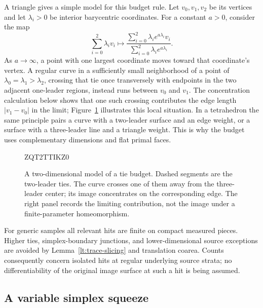 \documentclass[11pt]{article}
\numberwithin{equation}{section}
\theoremstyle{definition}
\theoremstyle{remark}
\begin{document}
A triangle gives a simple model for this budget rule. Let
$v_0,v_1,v_2$ be its vertices and let $\lambda_i>0$ be interior
barycentric coordinates. For a constant $a>0$, consider the map
\[
 \sum_{i=0}^2\lambda_i v_i
 \longmapsto
 \frac{\sum_{i=0}^2\lambda_i e^{a\lambda_i}v_i}
      {\sum_{i=0}^2\lambda_i e^{a\lambda_i}}.
\]
As $a\to\infty$, a point with one largest coordinate moves toward
that coordinate's vertex. A regular curve in a sufficiently small
neighborhood of a point of $\lambda_0=\lambda_1>\lambda_2$, crossing
that tie once transversely with endpoints in the
two adjacent one-leader regions, instead runs between $v_0$ and
$v_1$. The concentration calculation below shows that one such
crossing contributes the edge length $|v_1-v_0|$ in the limit;
Figure~\ref{lt:tie-model} illustrates this local situation. In a
tetrahedron the same principle pairs a curve with a two-leader
surface and an edge weight, or a surface with a three-leader line
and a triangle weight. This is why the budget uses complementary
dimensions and flat primal faces.

\begin{figure}[tb]

ZQT2TTIKZ0
\caption{A two-dimensional model of a tie budget. Dashed segments
are the two-leader ties. The curve crosses one of them away from
the three-leader center; its image concentrates on the corresponding
edge. The right panel records the limiting contribution, not the
image under a finite-parameter homeomorphism.}
\label{lt:tie-model}
\end{figure}

For generic samples all relevant hits are finite on compact measured
pieces.  Higher ties, simplex-boundary junctions, and lower-dimensional
source exceptions are avoided by Lemma~\ref{lt:trace-slicing} and
translation coarea.  Counts consequently concern isolated hits at
regular underlying source strata; no differentiability of the original
image surface at such a hit is being assumed.

\subsection{A variable simplex squeeze}
\end{document}

